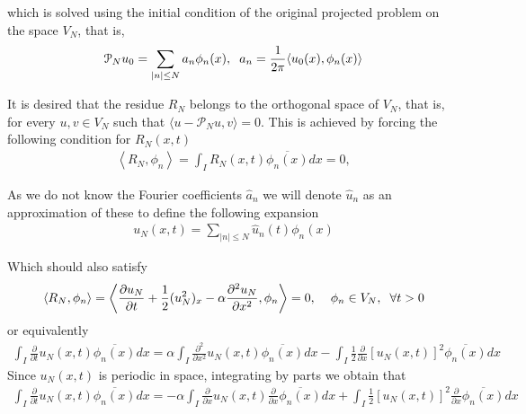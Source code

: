 		which is solved using the initial condition of the original projected problem on the space $ V_N $, that is,
		\begin{align*}
			\mathcal{P}_N u_0 = \displaystyle \sum_{|n| \leq N} a_n \phi_n (x), \hspace{2mm} a_n = \frac{1}{2 \pi} \langle u_0 (x), \phi_n (x) \rangle   
		\end{align*}
		
		It is desired that the residue $R_N$ belongs to the orthogonal space of $ V_N $, that is, for every $u, v \in V_N $ such that $\langle u - \mathcal{P}_N u, v \rangle = 0$. This is achieved by forcing the following condition for $R_N (x, t)$
		\begin{align*}
			\left\langle  R_N, \phi_n \right\rangle = \displaystyle \int_{I} R_{N} (x, t) \overline{\phi_n (x)} dx = 0,
		\end{align*}
		
		As we do not know the Fourier coefficients $\hat{a}_n$ we will denote $\hat{u}_n$ as an approximation of these to define the following expansion
		\begin{align*}
			u_N (x, t) = \displaystyle \sum_{ |n| \leq N } \hat{u}_n (t) \phi_n (x)
		\end{align*}
		
		Which should also satisfy
		\begin{align}
			\left\langle R_N, \phi_n \right\rangle = \left\langle \frac{\partial u_N}{\partial t} + \frac{1}{2} (u_N^2)_x - \alpha \frac{\partial^2 u_N}{\partial x^2}, \phi_n \right\rangle = 0, \hspace{2mm}  \hspace{2mm} \phi_n \in V_N, \hspace{2mm} \forall t > 0
		\end{align}
		or equivalently
		\begin{align*}
			\displaystyle \int_{I} \frac{\partial}{\partial t} u_N (x, t) \overline{\phi_n (x)} dx = \alpha \int_{I} \frac{\partial^2}{\partial x^2} u_N(x, t) \overline{\phi_n (x)} dx - \int_{I} \frac{1}{2} \frac{\partial}{\partial x} \left[ u_N(x, t) \right]^2 \overline{\phi_n (x)} dx   
		\end{align*}
		Since $u_N (x, t)$ is periodic in space, integrating by parts we obtain that
		\begin{align*}
			\displaystyle \int_{I} \frac{\partial}{\partial t} u_N (x, t) \overline{\phi_n (x)} dx = - \alpha \int_{I} \frac{\partial}{\partial x} u_N(x, t) \frac{\partial}{\partial x} \overline{\phi_n (x)} dx + \int_{I} \frac{1}{2} \left[ u_N(x, t) \right]^2 \frac{\partial}{\partial x} \overline{\phi_n (x)} dx   
		\end{align*} 
		
